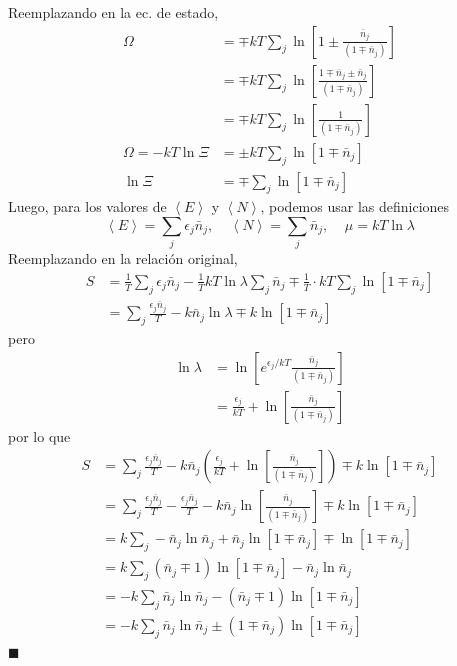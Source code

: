 \documentclass[]{article}
\numberwithin{equation}{section}
\newcommand{\0}{\textcolor{gray}{0}}
\newcommand{\pr}[1]{\left\langle #1 \right\rangle }
\newcommand{\qed}{\hfill\(\blacksquare\)}
\begin{document}
Reemplazando en la ec. de estado,
\begin{align}
	\Omega &= \mp k T \sum_{j}\ln \left[1 \pm \frac{\bar{n}_j}{\left( 1 \mp \bar{n}_j\right)}\right] \nonumber\\
	&= \mp k T \sum_{j}\ln \left[\frac{ 1 \mp \bar{n}_j \pm \bar{n}_j}{\left( 1 \mp \bar{n}_j\right)}\right] \nonumber\\
	&= \mp k T \sum_{j}\ln \left[\frac{ 1 }{\left( 1 \mp \bar{n}_j\right)}\right] \nonumber\\
	\Omega = - k T \ln \Xi &= \pm k T \sum_{j}\ln \left[1 \mp \bar{n}_j \right]\\
	\ln \Xi &= \mp \sum_{j}\ln \left[1 \mp \bar{n}_j \right]
\end{align}
Luego, para los valores de $\pr{E}$ y $\pr{N}$, podemos usar las definiciones
\begin{equation}
	\pr{E} = \sum_{j} \epsilon_j \bar{n}_j, ~~~~~ \pr{N} = \sum_{j} \bar{n}_j, ~~~~~ \mu = kT \ln\lambda
\end{equation}
Reemplazando en la relación original,
\begin{align*}
	S &= \frac{1}{T}\sum_{j} \epsilon_j \bar{n}_j - \frac{1}{T}kT \ln\lambda\sum_{j} \bar{n}_j \mp \frac{1}{T}\cdot k T \sum_{j} \ln \left[1 \mp \bar{n}_j \right] \\
	&= \sum_{j} \frac{\epsilon_j \bar{n}_j}{T} - k  \bar{n}_j \ln\lambda \mp k \ln \left[1 \mp \bar{n}_j \right]
\end{align*}
pero
\begin{align*}
	\ln\lambda &= \ln \left[e^{\epsilon_j/kT} \frac{\bar{n}_j}{\left( 1 \mp \bar{n}_j\right)}\right]\\
	&= \frac{\epsilon_j}{kT} + \ln\left[\frac{\bar{n}_j}{\left( 1 \mp \bar{n}_j\right)}\right]
\end{align*}
por lo que
\begin{align*}
	S &= \sum_{j} \frac{\epsilon_j \bar{n}_j}{T} - k  \bar{n}_j\left( \frac{\epsilon_j}{kT} + \ln\left[\frac{\bar{n}_j}{\left( 1 \mp \bar{n}_j\right)}\right]\right) \mp k \ln \left[1 \mp \bar{n}_j \right]\\
	&= \sum_{j} \frac{\epsilon_j \bar{n}_j}{T} - \frac{\epsilon_j \bar{n}_j}{T} - k  \bar{n}_j \ln\left[\frac{\bar{n}_j}{\left( 1 \mp \bar{n}_j\right)}\right] \mp k \ln \left[1 \mp \bar{n}_j \right]\\
	&= k\sum_{j} - \bar{n}_j \ln\bar{n}_j + \bar{n}_j \ln \left[ 1 \mp \bar{n}_j\right] \mp \ln \left[1 \mp \bar{n}_j \right]\\
	&= k\sum_{j} (\bar{n}_j \mp 1) \ln \left[1 \mp \bar{n}_j \right] - \bar{n}_j \ln\bar{n}_j \\
	&= -k\sum_{j} \bar{n}_j \ln\bar{n}_j - (\bar{n}_j \mp 1) \ln \left[1 \mp \bar{n}_j \right] \\
	&= -k\sum_{j} \bar{n}_j \ln\bar{n}_j \pm (1 \mp \bar{n}_j) \ln \left[1 \mp \bar{n}_j \right]
\end{align*}
\qed
\end{document}
